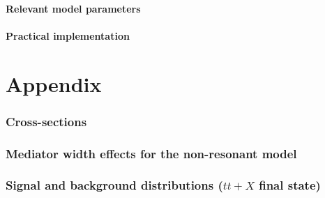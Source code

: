 \documentclass[UKenglish,texlive=2013]{\ATLASLATEXPATH atlasdoc}
\begin{document}
 \subsection{Relevant model parameters}

 
 
 \subsection{Practical implementation}

 

\clearpage
{} %
\printbibliography
%
%


\clearpage
\appendix
\part*{Appendix}

\section{Cross-sections}



\clearpage
\section{Mediator width effects for the non-resonant model}



\clearpage
\section{Signal and background distributions ($tt+X$ final state)}


\end{document}
